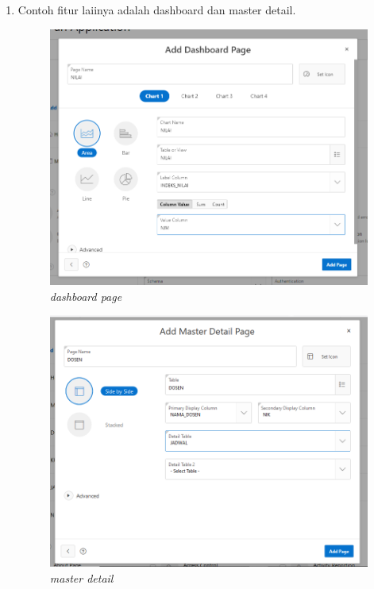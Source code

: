 \begin{enumerate}
    \item Contoh fitur laiinya adalah dashboard dan master detail.
    
    \begin{figure}[!htbp]
        \centering
        \includegraphics[scale=0.4]{figure/Capture_13_DASHBOARD.PNG}
        \caption{\textit{dashboard page}}
        \label{fig:my_label}
    \end{figure}
    
    \begin{figure}[!htbp]
        \centering
        \includegraphics[scale=0.4]{figure/Capture_15_MASTER_DETAIL.PNG}
        \caption{\textit{master detail}}
        \label{fig:my_label}
    \end{figure}
    

\end{enumerate}
